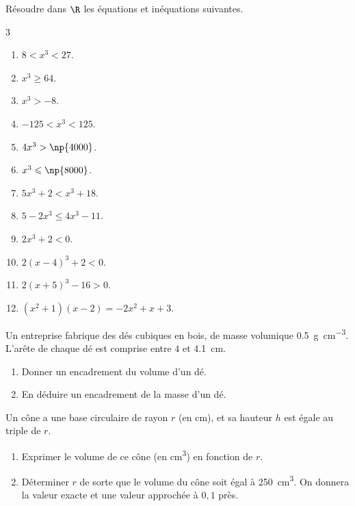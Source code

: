 Résoudre dans $\R$ les équations et inéquations suivantes.
\vspace{-6pt}
\setlength{\columnsep}{1cm}
\setlength{\columnseprule}{0pt}
\begin{multicols}{3}
\begin{enumerate}
\item $8<x^3<27$.
\medskip
\item $x^3\geqslant 64$.
\medskip
\item $x^3>-8$.
\medskip
\item $-125<x^3<125$.

\item $4x^3>\np{4000}$.
\medskip
\item $x^3\leqslant \np{8000}$.
\medskip
\item $5x^3+2<x^3+18$.
\medskip
\item $5-2x^3\leqslant 4x^3-11$.

\item $2x^3+2<0$.
\medskip
\item $2(x-4)^3+2<0$.
\medskip
\item $2(x+5)^3-16>0$.
\medskip
\item $(x^2+1)(x-2)=-2x^2+x+3$.
\end{enumerate}
\end{multicols}
\vspace{-6pt}

\exo

Un entreprise fabrique des dés cubiques en bois, de masse volumique \SI[per-mode=symbol]{0,5}{\g\per\cm^3}. L'arête de chaque dé est comprise entre $4$ et \SI[retain-explicit-plus]{4,1}{\cm}.
\begin{enumerate}
\item Donner un encadrement du volume d'un dé.
\item En déduire un encadrement de la masse d'un dé.
\end{enumerate}

\exo

Un cône a une base circulaire de rayon $r$ (en \si{cm}), et sa hauteur $h$ est égale au triple de $r$.
\begin{enumerate}
\item Exprimer le volume de ce cône (en \si{\cm^3}) en fonction de $r$.
\item Déterminer $r$ de sorte que le volume du cône soit égal à \SI[retain-explicit-plus]{250}{\cm^3}. On donnera la valeur exacte et une valeur approchée à $0,1$ près.
\end{enumerate}

